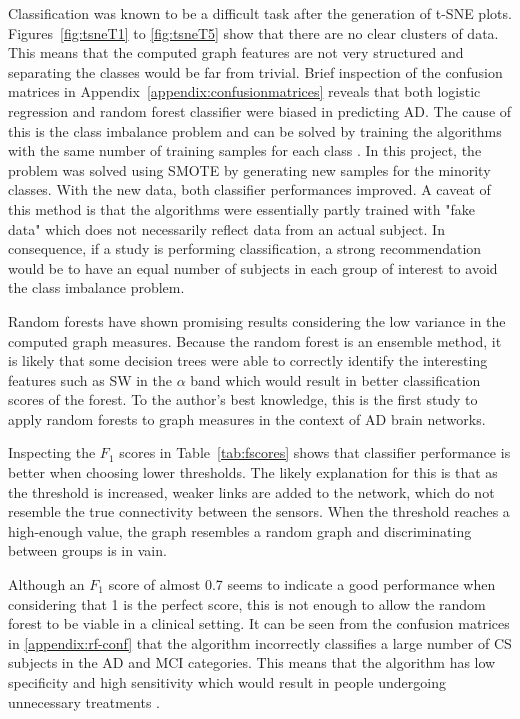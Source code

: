 Classification was known to be a difficult task after the generation of \ac{t-SNE} plots. Figures~\ref{fig:tsneT1} to \ref{fig:tsneT5} show that there are no clear clusters of data. This means that the computed graph features are not very structured and separating the classes would be far from trivial. Brief inspection of the confusion matrices in Appendix~\ref{appendix:confusionmatrices} reveals that both logistic regression and random forest classifier were biased in predicting \ac{AD}. The cause of this is the class imbalance problem and can be solved by training the algorithms with the same number of training samples for each class \autocite{Chawla:2002:SSM:1622407.1622416}. In this project, the problem was solved using \ac{SMOTE} by generating new samples for the minority classes. With the new data, both classifier performances improved. A caveat of this method is that the algorithms were essentially partly trained with "fake data" which does not necessarily reflect data from an actual subject. In consequence, if a study is performing classification, a strong recommendation would be to have an equal number of subjects in each group of interest to avoid the class imbalance problem.


Random forests \autocite{breiman2001random} have shown promising results considering the low variance in the computed graph measures. Because the random forest is an ensemble method, it is likely that some decision trees were able to correctly identify the interesting features such as \ac{SW} in the \(\alpha\) band which would result in better classification scores of the forest. To the author's best knowledge, this is the first study to apply random forests to graph measures in the context of \ac{AD} brain networks.

Inspecting the \(F_1\) scores in Table~\ref{tab:fscores} shows that classifier performance is better when choosing lower thresholds. The likely explanation for this is that as the threshold is increased, weaker links are added to the network, which do not resemble the true connectivity between the sensors. When the threshold reaches a high-enough value, the graph resembles a random graph and discriminating between groups is in vain.

Although an \(F_1\) score of almost 0.7 seems to indicate a good performance when considering that 1 is the perfect score, this is not enough to allow the random forest to be viable in a clinical setting. It can be seen from the confusion matrices in \ref{appendix:rf-conf} that the algorithm incorrectly classifies a large number of \ac{CS} subjects in the \ac{AD} and \ac{MCI} categories. This means that the algorithm has low specificity and high sensitivity which would result in people undergoing unnecessary treatments \autocite{Lalkhen01122008}.

